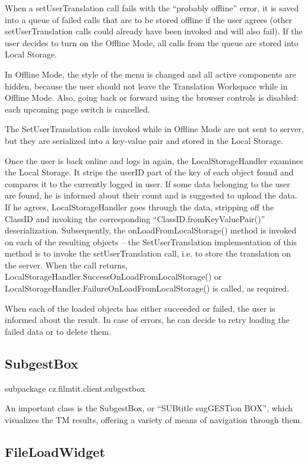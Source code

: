 When a setUserTranslation call fails with the ``probably offline'' error, it is saved into a queue of failed calls that are to be stored offline if the user agrees (other setUserTranslation calls could already have been invoked and will also fail). If the user decides to turn on the Offline Mode, all calls from the queue are stored into Local Storage.


In Offline Mode, the style of the menu is changed and all active components are hidden, because the user should not leave the Translation Workspace while in Offline Mode. Also, going back or forward using the browser controls is disabled: each upcoming page switch is cancelled.

The SetUserTranslation calls invoked while in Offline Mode are not sent to server, but they are serialized into a key-value pair and stored in the Local Storage.


Once the user is back online and logs in again, the LocalStorageHandler examines the Local Storage. It strips the userID part of the key of each object found and compares it to the currently logged in user. If some data belonging to the user are found, he is informed about their count and is suggested to upload the data. If he agrees, LocalStorageHandler goes through the data, stripping off the ClassID and invoking the corresponding ``ClassID.fromKeyValuePair()'' deserialization. Subsequently, the onLoadFromLocalStorage() method is invoked on each of the resulting objects -- the SetUserTranslation implementation of this method is to invoke the setUserTranslation call, i.e. to store the translation on the server. When the call returns, LocalStorageHandler.SuccessOnLoadFromLocalStorage() or LocalStorageHandler.FailureOnLoadFromLocalStorage() is called, as required.

When each of the loaded objects has either succeeded or failed, the user is informed about the result. In case of errors, he can decide to retry loading the failed data or to delete them.

\subsection{SubgestBox}

subpackage cz.filmtit.client.subgestbox

An important class is the SubgestBox, or ``SUBtitle sugGESTion BOX'', which visualizes the TM results, offering a variety of means of navigation through them.

\subsection{FileLoadWidget}

